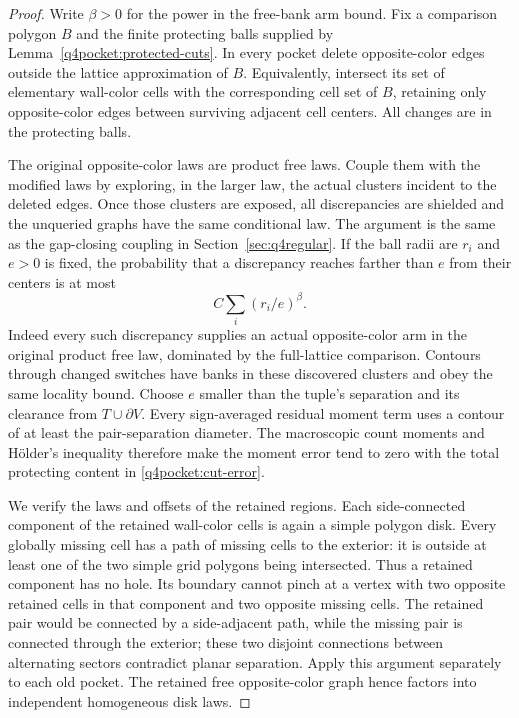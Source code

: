 \begin{proof}
Write $\beta>0$ for the power in the free-bank arm bound.  Fix a
comparison polygon $B$ and the finite protecting balls supplied
by Lemma~\ref{q4pocket:protected-cuts}.  In every pocket delete
opposite-color edges outside the lattice approximation of $B$.
Equivalently, intersect its set of elementary wall-color cells
with the corresponding cell set of $B$, retaining only
opposite-color edges between surviving adjacent cell centers.
All changes are in the protecting balls.

The original opposite-color laws are product free laws.  Couple
them with the modified laws by exploring, in the larger law, the
actual clusters incident to the deleted edges.  Once those
clusters are exposed, all discrepancies are shielded and the
unqueried graphs have the same conditional law.  The argument
is the same as the gap-closing coupling in
Section~\ref{sec:q4regular}.  If the ball radii are $r_i$ and $e>0$
is fixed, the probability that a discrepancy reaches farther than
$e$ from their centers is at most
\begin{equation}
 C\sum_i(r_i/e)^\beta.
 \label{q4pocket:cut-error}
\end{equation}
Indeed every such discrepancy supplies an actual opposite-color
arm in the original product free law, dominated by the full-lattice
comparison.  Contours through changed switches have banks in
these discovered clusters and obey the same locality bound.
Choose $e$ smaller than the tuple's separation and its clearance
from $T\cup\partial V$.  Every sign-averaged residual moment term
uses a contour of at least the pair-separation diameter.
The macroscopic count moments and H\"older's inequality therefore
make the moment error tend to zero with the total protecting
content in \eqref{q4pocket:cut-error}.

We verify the laws and offsets of the retained regions.  Each
side-connected component of the retained wall-color cells is
again a simple polygon disk.  Every globally missing cell has
a path of missing cells to the exterior: it is outside at least
one of the two simple grid polygons being intersected.  Thus a
retained component has no hole.  Its boundary cannot pinch at
a vertex with two opposite retained cells in that component
and two opposite missing cells.  The retained pair would be
connected by a side-adjacent path, while the missing pair is
connected through the exterior; these two disjoint connections
between alternating sectors contradict planar separation.
Apply this argument separately to each old pocket.  The
retained free opposite-color graph hence factors into
independent homogeneous disk laws.


\end{proof}
